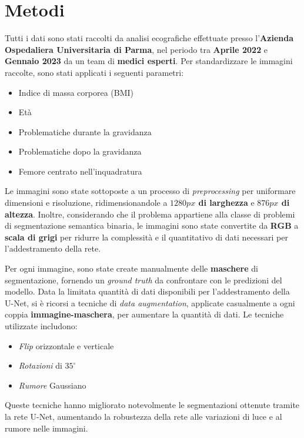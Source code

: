 \chapter{Metodi} %
\label{cha:Metodi}

Tutti i dati sono stati raccolti da analisi ecografiche effettuate presso l'\textbf{Azienda
Ospedaliera Universitaria di Parma}, nel periodo tra \textbf{Aprile 2022} e \textbf{Gennaio 2023} da
un team di \textbf{medici esperti}. Per standardizzare le immagini raccolte, sono stati applicati i
seguenti parametri:

\begin{itemize}
    \item Indice di massa corporea (BMI)
    \item Età
    \item Problematiche durante la gravidanza
    \item Problematiche dopo la gravidanza
    \item Femore centrato nell'inquadratura
\end{itemize}

Le immagini sono state sottoposte a un processo di \textit{preprocessing} per uniformare dimensioni
e risoluzione, ridimensionandole a \textbf{$1280px$ di larghezza} e \textbf{$876px$ di altezza}.
Inoltre, considerando che il problema appartiene alla classe di problemi di segmentazione semantica
binaria, le immagini sono state convertite da \textbf{RGB} a \textbf{scala di grigi} per ridurre la
complessità e il quantitativo di dati necessari per l'addestramento della rete.

Per ogni immagine, sono state create manualmente delle \textbf{maschere} di segmentazione, fornendo
un \textit{ground truth} da confrontare con le predizioni del modello. Data la limitata quantità di
dati disponibili per l'addestramento della U-Net, si è ricorsi a tecniche di \textit{data
augmentation}, applicate casualmente a ogni coppia \textbf{immagine-maschera}, per aumentare la
quantità di dati. Le tecniche utilizzate includono:

\begin{itemize}
    \item \textit{Flip} orizzontale e verticale
    \item \textit{Rotazioni} di $35^{\circ}$
    \item \textit{Rumore} Gaussiano
\end{itemize}

Queste tecniche hanno migliorato notevolmente le segmentazioni ottenute tramite la rete U-Net,
aumentando la robustezza della rete alle variazioni di luce e al rumore nelle immagini.

